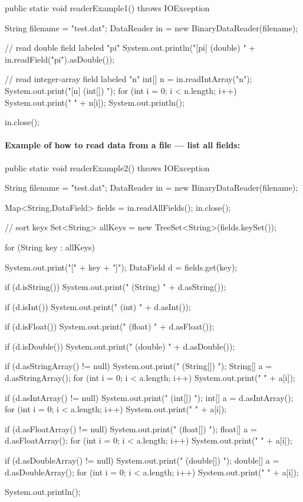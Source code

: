 \begin{vcode}

public static void readerExample1() throws IOException {
   String filename = "test.dat";
   DataReader in = new BinaryDataReader(filename);

   // read double field labeled "pi"
   System.out.println("[pi] (double) " + in.readField("pi").asDouble());

   // read integer-array field labeled "n"
   int[] n = in.readIntArray("n");
   System.out.print("[n] (int[]) ");
   for (int i = 0; i < n.length; i++)
      System.out.print(" " + n[i]);
   System.out.println();

   in.close();
}
\end{vcode}


\paragraph*{Example of how to read data from a file --- list all fields:}

\begin{vcode}

public static void readerExample2() throws IOException {
   String filename = "test.dat";
   DataReader in = new BinaryDataReader(filename);

   Map<String,DataField> fields = in.readAllFields();
   in.close();

   // sort keys
   Set<String> allKeys = new TreeSet<String>(fields.keySet());

   for (String key : allKeys) {
      System.out.print("[" + key + "]");
      DataField d = fields.get(key);

      if (d.isString())
         System.out.print(" (String) " + d.asString());

      if (d.isInt())
         System.out.print(" (int) " + d.asInt());

      if (d.isFloat())
         System.out.print(" (float) " + d.asFloat());

      if (d.isDouble())
         System.out.print(" (double) " + d.asDouble());

      if (d.asStringArray() != null) {
         System.out.print(" (String[]) ");
         String[] a = d.asStringArray();
         for (int i = 0; i < a.length; i++)
            System.out.print(" " + a[i]);
      }

      if (d.asIntArray() != null) {
         System.out.print(" (int[]) ");
         int[] a = d.asIntArray();
         for (int i = 0; i < a.length; i++)
            System.out.print(" " + a[i]);
      }

      if (d.asFloatArray() != null) {
         System.out.print(" (float[]) ");
         float[] a = d.asFloatArray();
         for (int i = 0; i < a.length; i++)
            System.out.print(" " + a[i]);
      }

      if (d.asDoubleArray() != null) {
         System.out.print(" (double[]) ");
         double[] a = d.asDoubleArray();
         for (int i = 0; i < a.length; i++)
            System.out.print(" " + a[i]);
      }

      System.out.println();
   }
}
\end{vcode}
